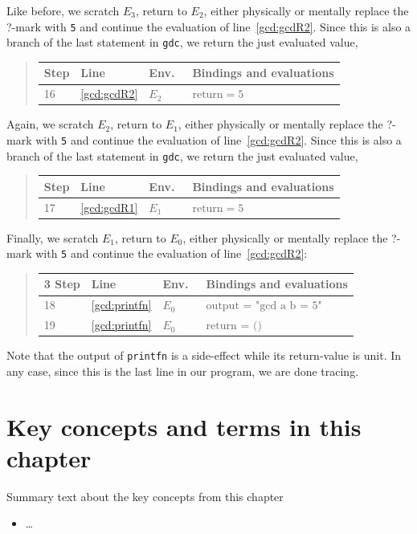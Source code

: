 \documentclass[fsharpNotes.tex]{subfiles}
\begin{document}
Like before, we scratch $E_3$, return to $E_2$, either physically or mentally replace the ?-mark with \lstinline!5! and continue the evaluation of line~\ref{gcd:gcdR2}. Since this is also a branch of the last statement in \lstinline{gdc}, we return the just evaluated value,
\begin{quote}
  \begin{tabular*}{0.6\linewidth}{l|lll}
    Step & Line & Env.\ & Bindings and evaluations\\
    \hline
    16&\ref{gcd:gcdR2} & $E_2$ & $\text{return} = 5$\\
  \end{tabular*}
\end{quote}
Again, we scratch $E_2$, return to $E_1$, either physically or mentally replace the ?-mark with \lstinline!5! and continue the evaluation of line~\ref{gcd:gcdR2}. Since this is also a branch of the last statement in \lstinline{gdc}, we return the just evaluated value,
\begin{quote}
  \begin{tabular*}{0.6\linewidth}{l|lll}
    Step & Line & Env.\ & Bindings and evaluations\\
    \hline
    17&\ref{gcd:gcdR1} & $E_1$ & $\text{return} = 5$\\
  \end{tabular*}
\end{quote}
Finally, we scratch $E_1$, return to $E_0$, either physically or mentally replace the ?-mark with \lstinline!5! and continue the evaluation of line~\ref{gcd:gcdR2}:
\begin{quote}
  \begin{tabular*}{0.6\linewidth}{l|lll}3
    Step & Line & Env.\ & Bindings and evaluations\\
    \hline
    18 & \ref{gcd:printfn} & $E_0$ & $\text{output = "gcd a b = 5"}$\\
    19 & \ref{gcd:printfn} & $E_0$ & $\text{return = ()}$\\
  \end{tabular*}
\end{quote}
Note that the output of \lstinline{printfn} is a side-effect while its return-value is unit. In any case, since this is the last line in our program, we are done tracing.

\section{Key concepts and terms in this chapter}
Summary text about the key concepts from this chapter
\begin{itemize}
\item \ldots
\end{itemize}
\end{document}
